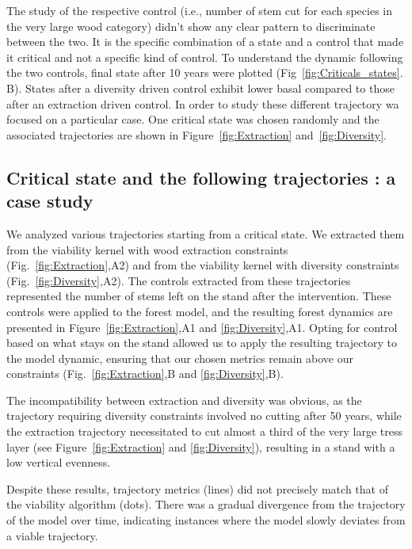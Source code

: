 \documentclass{article}
\begin{document}
The study of the respective control (i.e., number of stem cut for each species in the very large wood category) didn't show any clear pattern to discriminate between the two. It is the specific combination of a state and a control that made it critical and not a specific kind of control. To understand the dynamic following the two controls, final state after 10 years were plotted (Fig~\ref{fig:Criticals_states}. B). States after a diversity driven control exhibit lower basal compared to those after an extraction driven control. In order to study these different trajectory wa focused on a particular case. One critical state was chosen randomly and the associated trajectories are shown in Figure~\ref{fig:Extraction} and~\ref{fig:Diversity}.

\subsection{Critical state and the following trajectories : a case study}

We analyzed various trajectories starting from a critical state. We extracted them from the viability kernel with wood extraction constraints (Fig.~\ref{fig:Extraction},A2) and from the viability kernel with diversity constraints (Fig.~\ref{fig:Diversity},A2). The controls extracted from these trajectories represented the number of stems left on the stand after the intervention. These controls were applied to the forest model, and the resulting forest dynamics are presented in Figure~\ref{fig:Extraction},A1 and \ref{fig:Diversity},A1. Opting for control based on what stays on the stand allowed us to apply the resulting trajectory to the model dynamic, ensuring that our chosen metrics remain above our constraints (Fig.~\ref{fig:Extraction},B and \ref{fig:Diversity},B).

The incompatibility between extraction and diversity was obvious, as the trajectory requiring diversity constraints involved no cutting after 50 years, while the extraction trajectory necessitated to cut almost a third of the very large tress layer (see Figure~\ref{fig:Extraction} and \ref{fig:Diversity}), resulting in a stand with a low vertical evenness.

Despite these results, trajectory metrics (lines) did not precisely match that of the viability algorithm (dots). There was a gradual divergence from the trajectory of the model over time, indicating instances where the model slowly deviates from a viable trajectory.
\end{document}
